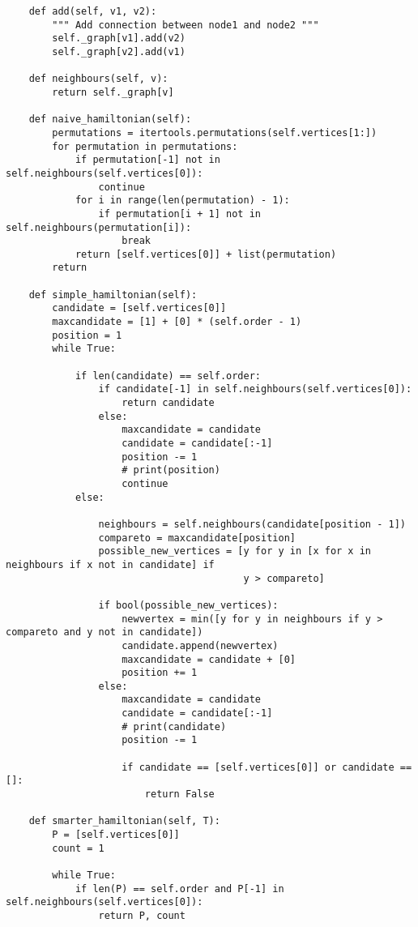 \documentclass[10pt,a4paper]{report}
\begin{document}
\begin{verbatim}
    def add(self, v1, v2):
        """ Add connection between node1 and node2 """
        self._graph[v1].add(v2)
        self._graph[v2].add(v1)

    def neighbours(self, v):
        return self._graph[v]

    def naive_hamiltonian(self):
        permutations = itertools.permutations(self.vertices[1:])
        for permutation in permutations:
            if permutation[-1] not in self.neighbours(self.vertices[0]):
                continue
            for i in range(len(permutation) - 1):
                if permutation[i + 1] not in self.neighbours(permutation[i]):
                    break
            return [self.vertices[0]] + list(permutation)
        return

    def simple_hamiltonian(self):
        candidate = [self.vertices[0]]
        maxcandidate = [1] + [0] * (self.order - 1)
        position = 1
        while True:

            if len(candidate) == self.order:
                if candidate[-1] in self.neighbours(self.vertices[0]):
                    return candidate
                else:
                    maxcandidate = candidate
                    candidate = candidate[:-1]
                    position -= 1
                    # print(position)
                    continue
            else:

                neighbours = self.neighbours(candidate[position - 1])
                compareto = maxcandidate[position]
                possible_new_vertices = [y for y in [x for x in neighbours if x not in candidate] if
                                         y > compareto]

                if bool(possible_new_vertices):
                    newvertex = min([y for y in neighbours if y > compareto and y not in candidate])
                    candidate.append(newvertex)
                    maxcandidate = candidate + [0]
                    position += 1
                else:
                    maxcandidate = candidate
                    candidate = candidate[:-1]
                    # print(candidate)
                    position -= 1

                    if candidate == [self.vertices[0]] or candidate == []:
                        return False

    def smarter_hamiltonian(self, T):
        P = [self.vertices[0]]
        count = 1

        while True:
            if len(P) == self.order and P[-1] in self.neighbours(self.vertices[0]):
                return P, count


\end{verbatim}
\end{document}
